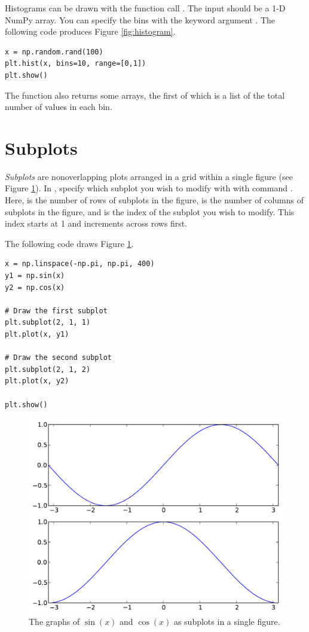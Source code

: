 Histograms can be drawn with the function call . 
The input  should be a 1-D NumPy array.
You can specify the bins with the keyword argument .
The following code produces Figure \ref{fig:histogram}.

\begin{lstlisting}
x = np.random.rand(100)
plt.hist(x, bins=10, range=[0,1])
plt.show()
\end{lstlisting}

The function  also returns some arrays, the first of which is a list of the total number of values in each bin.




\section*{Subplots}
\emph{Subplots} are nonoverlapping plots arranged in a grid within a single figure (see Figure \ref{fig:subplots}).
In , specify which subplot you wish to modify with with command .
Here,  is the number of rows of subplots in the figure,  is the number of columns of subplots in the figure, and  is the index of the subplot you wish to modify.
This index starts at 1 and increments across rows first.

The following code draws Figure \ref{fig:subplots}.
\begin{lstlisting}
x = np.linspace(-np.pi, np.pi, 400)
y1 = np.sin(x)
y2 = np.cos(x)

# Draw the first subplot
plt.subplot(2, 1, 1)
plt.plot(x, y1)

# Draw the second subplot
plt.subplot(2, 1, 2)
plt.plot(x, y2)

plt.show()
\end{lstlisting}

\begin{figure}
\includegraphics[width=\textwidth]{subplots.pdf}
\caption{The graphs of $\sin(x)$ and $\cos(x)$ as subplots in a single figure.}
\label{fig:subplots}
\end{figure}

